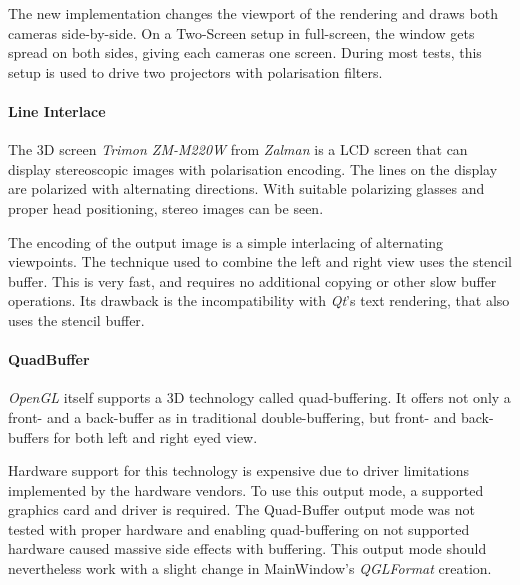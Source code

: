 The new implementation changes the viewport of the rendering and draws both cameras side-by-side.
On a Two-Screen setup in full-screen, the window gets spread on both sides, giving each cameras one screen.
During most tests, this setup is used to drive two projectors with polarisation filters.

\paragraph{Line Interlace}
The 3D screen \textit{Trimon ZM-M220W} from \textit{Zalman} is a LCD screen that can display stereoscopic images with polarisation encoding.
The lines on the display are polarized with alternating directions.
With suitable polarizing glasses and proper head positioning, stereo images can be seen.

The encoding of the output image is a simple interlacing of alternating viewpoints.
The technique used to combine the left and right view uses the stencil buffer.
This is very fast, and requires no additional copying or other slow buffer operations.
Its drawback is the incompatibility with \textit{Qt}'s text rendering, that also uses the stencil buffer.

\paragraph{QuadBuffer}
\textit{OpenGL} itself supports a 3D technology called quad-buffering.
It offers not only a front- and a back-buffer as in traditional double-buffering,
but front- and back-buffers for both left and right eyed view.

Hardware support for this technology is expensive due to driver limitations implemented by the hardware vendors.
To use this output mode, a supported graphics card and driver is required.
The Quad-Buffer output mode was not tested with proper hardware and enabling quad-buffering on not supported hardware caused massive side effects with buffering.
This output mode should nevertheless work with a slight change in MainWindow's \textit{QGLFormat} creation.

